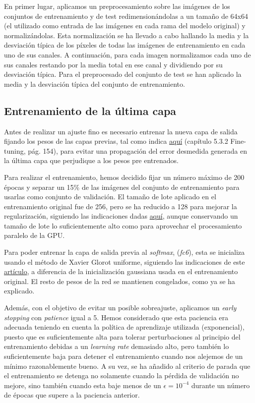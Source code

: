 \documentclass[10pt,a4paper]{article}
\begin{document}
En primer lugar, aplicamos un preprocesamiento sobre las imágenes de los conjuntos de entrenamiento y de test redimensionándolas a un tamaño de 64x64 (el utilizado como entrada de las imágenes en cada rama del modelo original) y normalizándolas. Esta normalización se ha llevado a cabo hallando la media y la desviación típica de los píxeles de todas las imágenes de entrenamiento en cada uno de sus canales. A continuación, para cada imagen normalizamos cada uno de sus canales restando por la media total en ese canal y dividiendo por su desviación típica. Para el preprocesado del conjunto de test se han aplicado la media y la desviación típica del conjunto de entrenamiento.


\subsection{Entrenamiento de la última capa}

Antes de realizar un ajuste fino es necesario entrenar la nueva capa de salida fijando los pesos de las capas previas, tal como indica \href{http://faculty.neu.edu.cn/yury/AAI/Textbook/Deep\%20Learning\%20with\%20Python.pdf}{aquí} (capítulo 5.3.2 Fine-tuning, pág. 154), para evitar una propagación del error desmedida generada en la última capa que perjudique a los pesos pre entrenados.  

Para realizar el entrenamiento, hemos decidido fijar un número máximo de 200 épocas y separar un 15\% de las imágenes del conjunto de entrenamiento para usarlas como conjunto de validación. El tamaño de lote aplicado en el entrenamiento original fue de 256, pero se ha reducido a 128 para mejorar la regularización, siguiendo las indicaciones dadas \href{https://arxiv.org/abs/1206.5533}{aquí}, aunque conservando un tamaño de lote lo suficientemente alto como para aprovechar el procesamiento paralelo de la GPU. 

Para poder entrenar la capa de salida previa al \textit{softmax}, (\textit{fc6}), esta se inicializa usando el método de Xavier Glorot uniforme, siguiendo las indicaciones de este \href{http://proceedings.mlr.press/v9/glorot10a.html}{artículo}, a diferencia de la inicialización gaussiana usada en el entrenamiento original. El resto de pesos de la red se mantienen congelados, como ya se ha explicado.

Además, con el objetivo de evitar un posible sobreajuste, aplicamos un \textit{early stopping} con \textit{patience} igual a 5. Hemos considerado que esta paciencia era adecuada teniendo en cuenta la política de aprendizaje utilizada (exponencial), puesto que es suficientemente alta para tolerar perturbaciones al principio del entrenamiento debidas a un \textit{learning rate} demasiado alto, pero también lo suficientemente baja para detener el entrenamiento cuando nos alejemos de un mínimo razonablemente bueno. A su vez, se ha añadido al criterio de parada que el entrenamiento se detenga no solamente cuando la pérdida de validación no mejore, sino también cuando esta baje menos de un $\epsilon = 10^{-4}$ durante un número de épocas que supere a la paciencia anterior.
\end{document}
